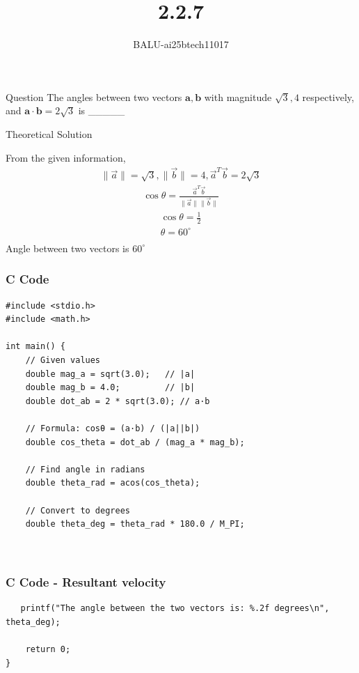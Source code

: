 \documentclass{beamer}
\title %
{2.2.7}
\author %
{BALU-ai25btech11017}
\begin{document}
\frame{\titlepage}
\begin{frame}{Question}
The angles between two vectors $\mathbf{a}, \mathbf{b}$ with magnitude $\sqrt{3}, 4$ respectively, and $\mathbf{a} \cdot \mathbf{b} = 2\sqrt{3}$ is \_\_\_\_\_
\\ 
\end{frame}



\begin{frame}{Theoretical Solution}

From the given information,
\begin{align}
   \|\vec{a}\|=\sqrt{3},\|\vec{b}\|=4,\vec{a}^T\vec{b}=2\sqrt{3}
   \end{align}
   \begin{align}
 \cos\theta=\frac{\vec{a}^T\vec{b}}{\|\vec{a}\|\|\vec{b}\|}
\end{align}
\begin{align}
  \cos\theta=\frac{1}{2}\\
  \theta=60^{\circ}\\
\end{align}
Angle between two vectors is $60^{\circ}$
\end{frame}
\begin{frame}[fragile]
    \frametitle{C Code}

    \begin{lstlisting}
#include <stdio.h>
#include <math.h>

int main() {
    // Given values
    double mag_a = sqrt(3.0);   // |a|
    double mag_b = 4.0;         // |b|
    double dot_ab = 2 * sqrt(3.0); // a·b

    // Formula: cosθ = (a·b) / (|a||b|)
    double cos_theta = dot_ab / (mag_a * mag_b);

    // Find angle in radians
    double theta_rad = acos(cos_theta);

    // Convert to degrees
    double theta_deg = theta_rad * 180.0 / M_PI;

   

     \end{lstlisting}
\end{frame}
\begin{frame}[fragile]
    \frametitle{C Code - Resultant velocity}

    \begin{lstlisting}
   printf("The angle between the two vectors is: %.2f degrees\n", theta_deg);

    return 0;
}
    \end{lstlisting}
\end{frame}
\end{document}
